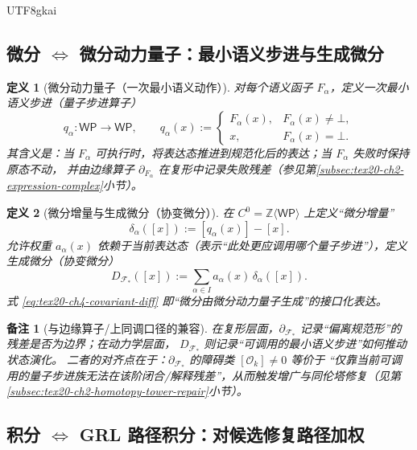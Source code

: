 \documentclass[12pt]{article}
\newtheorem{definition}{定义}[section]
\newtheorem{remark}{备注}[section]
\begin{document}
\begin{CJK*}{UTF8}{gkai}
\subsection{微分 \texorpdfstring{$\Longleftrightarrow$}{<->} 微分动力量子：最小语义步进与生成微分}
\label{subsec:tex20-ch4-differential-quantum}

\begin{definition}[微分动力量子（一次最小语义动作）]
对每个语义函子 $F_\alpha$，定义一次最小语义步进（量子步进算子）
\[
q_\alpha:\mathsf{WP}\to \mathsf{WP},
\qquad
q_\alpha(x):=
\begin{cases}
F_\alpha(x), & F_\alpha(x)\neq \bot,\\
x, & F_\alpha(x)=\bot.
\end{cases}
\]
其含义是：当 $F_\alpha$ 可执行时，将表达态推进到规范化后的表达；当 $F_\alpha$ 失败时保持原态不动，
并由边缘算子 $\partial_{F_\alpha}$ 在复形中记录失败残差（参见第\ref{subsec:tex20-ch2-expression-complex}小节）。
\end{definition}

\begin{definition}[微分增量与生成微分（协变微分）]
在 $C^0=\mathbb{Z}\langle \mathsf{WP}\rangle$ 上定义“微分增量”
\[
\delta_\alpha([x]):=[q_\alpha(x)]-[x].
\]
允许权重 $a_\alpha(x)$ 依赖于当前表达态（表示“此处更应调用哪个量子步进”），定义生成微分（协变微分）
\[
D_{\mathcal{F}_\ast}([x])
:=
\sum_{\alpha\in I} a_\alpha(x)\,\delta_\alpha([x]).
\tag{E4.1}
\label{eq:tex20-ch4-covariant-diff}
\]
式 \eqref{eq:tex20-ch4-covariant-diff} 即“微分由微分动力量子生成”的接口化表达。
\end{definition}

\begin{remark}[与边缘算子/上同调口径的兼容]
在复形层面，$\partial_{\mathcal{F}_\ast}$ 记录“偏离规范形”的残差是否为边界；在动力学层面，
$D_{\mathcal{F}_\ast}$ 则记录“可调用的最小语义步进”如何推动状态演化。
二者的对齐点在于：$\partial_{\mathcal{F}_\ast}$ 的障碍类 $[\mathcal{O}_k]\neq 0$ 等价于
“仅靠当前可调用的量子步进族无法在该阶闭合/解释残差”，从而触发增广与同伦塔修复（见第\ref{subsec:tex20-ch2-homotopy-tower-repair}小节）。\cite{EdgeOperatorTowerTex17,
  AxiomSemanticsWorkflowTex18}
\end{remark}

\subsection{积分 \texorpdfstring{$\Longleftrightarrow$}{<->} \textsf{GRL} 路径积分：对候选修复路径加权}
\label{subsec:tex20-ch4-grl-path-integral}


\end{CJK*}
\end{document}
